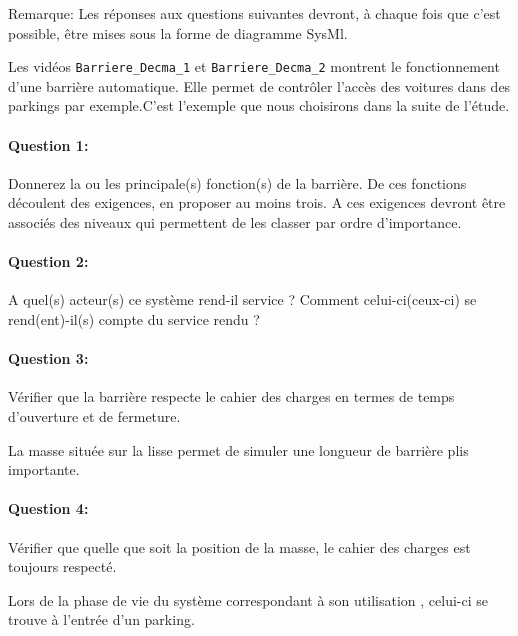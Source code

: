 


Remarque: Les réponses aux questions suivantes devront, à chaque fois que c'est possible, être mises sous la forme de diagramme SysMl.


Les vidéos \texttt{Barriere\_Decma\_1} et \texttt{Barriere\_Decma\_2} montrent le fonctionnement d'une barrière automatique. Elle permet de contrôler l'accès des voitures dans des parkings par exemple.C'est l'exemple que nous choisirons dans la suite de l'étude.

\paragraph{Question 1:} Donnerez la ou les principale(s) fonction(s) de la barrière. De ces fonctions découlent des exigences, en proposer au moins trois. A ces exigences devront être associés des niveaux qui permettent de les classer par ordre d'importance.

\paragraph{Question 2:} A quel(s) acteur(s) ce système rend-il service ? Comment celui-ci(ceux-ci) se rend(ent)-il(s) compte du service rendu ?


\paragraph{Question 3:} Vérifier que la barrière respecte le cahier des charges en termes de temps d'ouverture et de fermeture.

La masse située sur la lisse permet de simuler une longueur de barrière plis importante.

\paragraph{Question 4:} Vérifier que quelle que soit la position de la masse, le cahier des charges est toujours respecté.


Lors de la phase de vie du système correspondant à son \og utilisation \fg, celui-ci se trouve à l'entrée d'un parking.

